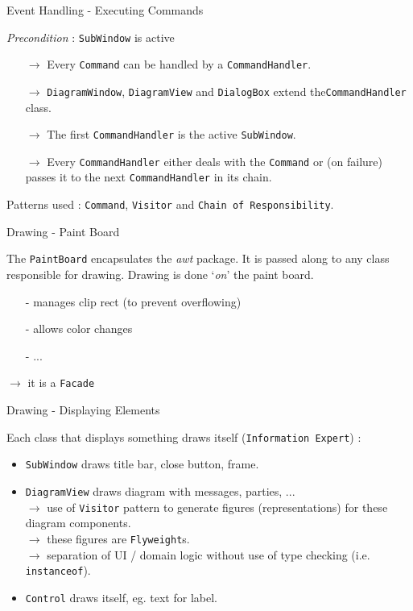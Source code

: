 \documentclass[10pt]{beamer}
\begin{document}
\begin{frame}[fragile]{Event Handling - Executing Commands}
	\begin{center}
	\textit{Precondition} : \texttt{SubWindow} is active
	\begin{itemize}
	\item[$\rightarrow$] Every \texttt{Command} can be handled by a \texttt{CommandHandler}.
	\item[$\rightarrow$] \texttt{DiagramWindow}, \texttt{DiagramView} and \texttt{DialogBox} extend the\texttt{CommandHandler} class. 
	\item[$\rightarrow$] The first \texttt{CommandHandler} is the active \texttt{SubWindow}.
	\item[$\rightarrow$] Every \texttt{CommandHandler} either deals with the \texttt{Command} or (on failure) passes it to the next \texttt{CommandHandler} in its chain. 
	\end{itemize}
	Patterns used : \texttt{Command}, \texttt{Visitor} and \texttt{Chain of Responsibility}.
	\end{center}
\end{frame}

\begin{frame}[fragile]{Drawing - Paint Board}
	\begin{center}
	The \texttt{PaintBoard} encapsulates the \textit{awt} package. It is passed along to any class responsible for drawing. Drawing is done `\textit{on}' the paint board.
	\begin{itemize}
	\item[-] manages clip rect (to prevent overflowing)
	\item[-] allows color changes
	\item[-] ...
	\end{itemize}
	$\rightarrow$ it is a \texttt{Facade}
	\end{center}
\end{frame}

\begin{frame}[fragile]{Drawing - Displaying Elements}
	\begin{center}
	Each class that displays something draws itself (\texttt{Information Expert}) :
	\begin{itemize}
	\item \texttt{SubWindow} draws title bar, close button, frame.
	\item \texttt{DiagramView} draws diagram with messages, parties, ...
	\\$\rightarrow$ use of \texttt{Visitor} pattern to generate figures (representations) for these diagram components.
	\\$\rightarrow$ these figures are \texttt{Flyweight}s.
	\\$\rightarrow$ separation of UI / domain logic without use of type checking (i.e. \texttt{instanceof}).
	\item \texttt{Control} draws itself, eg. text for label.
	\end{itemize}
	\end{center}
\end{frame}
\end{document}
